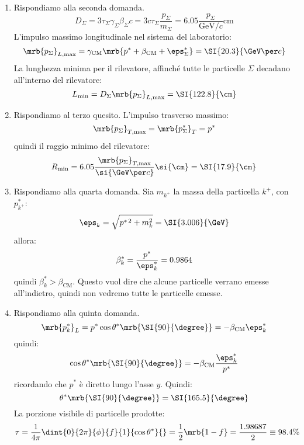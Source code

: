 \begin{example}
\begin{enumerate}
    \item Rispondiamo alla seconda domanda.
      \[
        D _{\Sigma} = 3 \tau _{\Sigma} \gamma _{\Sigma} \beta _{\Sigma} c = 3 c
        \tau _{\Sigma} \frac{p _{\Sigma}}{m _{\Sigma}} =
        6.05 \frac{p _{\Sigma}}{\si{\GeV \per c}} \si{\cm}
      \]
      L'impulso massimo longitudinale nel sistema del laboratorio:
      \[
        \mrb{p _{\Sigma}} _{L, \text{max}} = \gamma _\text{CM} \mrb{p ^{\ast} +
        \beta _\text{CM} + \eps _{\Sigma}^{\ast}} = \SI{20.3}{\GeV \per c}
      \]
      La lunghezza minima per il rilevatore, affinché tutte le particelle
      $\Sigma$ decadano all'interno del rilevatore:
      \[
        L _\text{min} = D _{\Sigma} \mrb{p _{\Sigma}}_{L, \text{max}} =
        \SI{122.8}{\cm}
      \]
    
    \item Rispondiamo al terzo quesito. L'impulso trasverso massimo:
      \[
        \mrb{p _{\Sigma}}_{T, \text{max}} = \mrb{p _{\Sigma}^{\ast}}_{T} =
        p^\ast
      \]
      quindi il raggio minimo del rilevatore:
      \[
        R _\text{min} = 6.05 \frac{\mrb{p _{\Sigma}}_{T, \text{max}}}{\si{\GeV
        \per c}} \si{\cm} = \SI{17.9}{\cm}
      \]

    \item Rispondiamo alla quarta domanda. Sia $m _{k^+}$ la massa della
      particella
      $k^+$, con $p ^{\ast} _{k^+}$:
      \[
        \eps _{k} = \sqrt{p ^{\ast\, 2} + m _{k}^{2}} = \SI{3.006}{\GeV}
      \]
      allora:
      \[
        \beta _{k}^{\ast} = \frac{p ^{\ast}}{\eps _{k}^{\ast}} = 0.9864
      \]
      quindi $\beta _{k}^{\ast} > \beta _\text{CM}$. Questo vuol dire che
      alcune particelle verrano emesse all'indietro, quindi non vedremo tutte
      le particelle emesse.

    \item Rispondiamo alla quinta domanda.
      \[
        \mrb{p _{k}^{\ast}}_{L} = p ^{\ast} \cos \theta^\ast \mrb{\SI{90}{\degree}}
        = - \beta _\text{CM} \eps _{k}^{\ast}
      \]
      quindi:
      \[
        \cos \theta^\ast \mrb{\SI{90}{\degree}} = - \beta _\text{CM} \frac{\eps
        _{k}^{\ast}}{p ^{\ast}}
      \]
      ricordando che $p^\ast$ è diretto lungo l'asse $y$.
      Quindi:
      \[
        \theta ^{\ast} \mrb{\SI{90}{\degree}} = \SI{165.5}{\degree}
      \]
      La porzione visibile di particelle prodotte:
      \[
        \tau = \frac{1}{4 \pi} \dint{0}{2 \pi}{\phi}{f}{1}{\cos \theta^\ast}{} = %
        \frac{1}{2} \mrb{1 - f} = \frac{1.98687}{2} \equiv 98.4 \%
      \]
  \end{enumerate}
\end{example}
